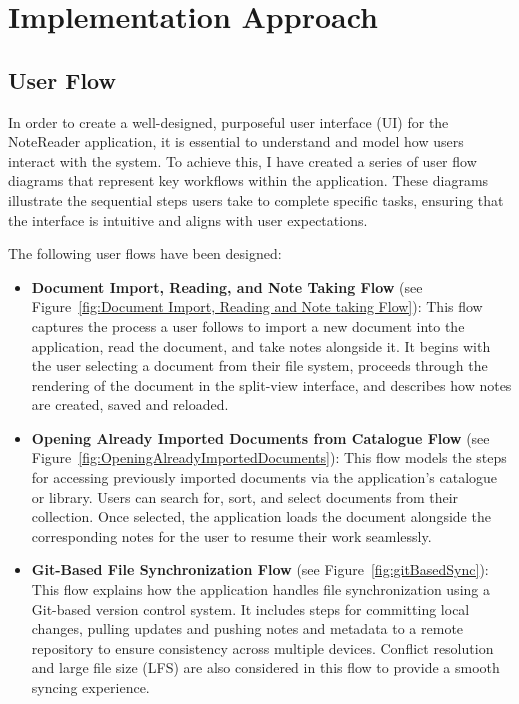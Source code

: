 \chapter{Implementation Approach}
\label{chap:implementation}

\section{User Flow} 
In order to create a well-designed, purposeful user interface (UI) for the NoteReader application, it is essential to understand and model how users interact with the system. To achieve this, I have created a series of user flow diagrams that represent key workflows within the application. These diagrams illustrate the sequential steps users take to complete specific tasks, ensuring that the interface is intuitive and aligns with user expectations.

The following user flows have been designed:

\begin{itemize}
    \item \textbf{Document Import, Reading, and Note Taking Flow} (see Figure~\ref{fig:Document Import, Reading and Note taking Flow}): 
    This flow captures the process a user follows to import a new document into the application, read the document, and take notes alongside it. It begins with the user selecting a document from their file system, proceeds through the rendering of the document in the split-view interface, and describes how notes are created, saved and reloaded. 

    \item \textbf{Opening Already Imported Documents from Catalogue Flow} (see Figure~\ref{fig:OpeningAlreadyImportedDocuments}): 
    This flow models the steps for accessing previously imported documents via the application's catalogue or library. Users can search for, sort, and select documents from their collection. Once selected, the application loads the document alongside the corresponding notes for the user to resume their work seamlessly.

    \item \textbf{Git-Based File Synchronization Flow} (see Figure~\ref{fig:gitBasedSync}): 
    This flow explains how the application handles file synchronization using a Git-based version control system. It includes steps for committing local changes, pulling updates and pushing notes and metadata to a remote repository to ensure consistency across multiple devices. Conflict resolution and large file size (LFS) are also considered in this flow to provide a smooth syncing experience.
\end{itemize}

